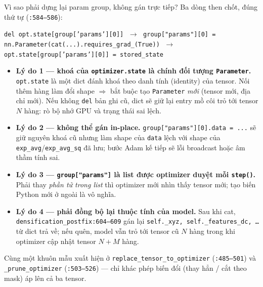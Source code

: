 \begin{frame}{Vì sao phải dựng lại param group, không gán trực tiếp?}
\footnotesize
Ba dòng then chốt, đúng thứ tự (\texttt{:584--586}):
\begin{center}
\texttt{del opt.state[group['params'][0]]} $\;\to\;$ \texttt{group["params"][0] = nn.Parameter(cat(...).requires\_grad\_(True))} $\;\to\;$ \texttt{opt.state[group['params'][0]] = stored\_state}
\end{center}
\begin{itemize}
\item \textbf{Lý do 1 — khoá của \texttt{optimizer.state} là chính đối tượng \texttt{Parameter}.} \texttt{opt.state} là một dict đánh khoá theo danh tính (identity) của tensor. Nối thêm hàng làm đổi shape $\Rightarrow$ bắt buộc tạo \texttt{Parameter} \emph{mới} (tensor mới, địa chỉ mới). Nếu không \texttt{del} bản ghi cũ, dict sẽ giữ lại entry mồ côi trỏ tới tensor $N$ hàng: rò bộ nhớ GPU và trạng thái sai lệch.
\item \textbf{Lý do 2 — không thể gán in-place.} \texttt{group["params"][0].data = ...} sẽ giữ nguyên khoá cũ nhưng làm shape của \texttt{data} lệch với shape của \texttt{exp\_avg}/\texttt{exp\_avg\_sq} đã lưu; bước Adam kế tiếp sẽ lỗi broadcast hoặc âm thầm tính sai.
\item \textbf{Lý do 3 — \texttt{group["params"]} là list được optimizer duyệt mỗi \texttt{step()}.} Phải thay \emph{phần tử trong list} thì optimizer mới nhìn thấy tensor mới; tạo biến Python mới ở ngoài là vô nghĩa.
\item \textbf{Lý do 4 — phải đồng bộ lại thuộc tính của model.} Sau khi cat, \texttt{densification\_postfix:604--609} gán lại \texttt{self.\_xyz, self.\_features\_dc, \dots} từ dict trả về; nếu quên, model vẫn trỏ tới tensor cũ $N$ hàng trong khi optimizer cập nhật tensor $N{+}M$ hàng.
\end{itemize}
Cùng một khuôn mẫu xuất hiện ở \texttt{replace\_tensor\_to\_optimizer} (\texttt{:485--501}) và \texttt{\_prune\_optimizer} (\texttt{:503--526}) — chỉ khác phép biến đổi (thay hẳn / cắt theo mask) áp lên cả ba tensor.
\end{frame}


